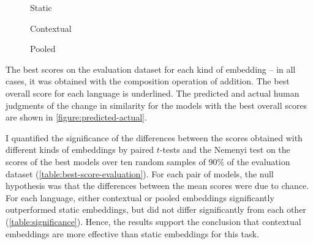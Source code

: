\begin{table}
  \centering
  \begin{subfigure}[b]{\textwidth}
    \centering
    
    \caption{Static}
  \end{subfigure}
  \subfigurespace
  \begin{subfigure}[b]{\textwidth}
    \centering
    
    \caption{Contextual}
  \end{subfigure}
  \subfigurespace
  \begin{subfigure}[b]{\textwidth}
    \centering
    
    \caption{Pooled}
  \end{subfigure}
  \caption{The best scores on the evaluation dataset for each kind of embedding -- in
    all cases, it was obtained with the composition operation of addition.
    The best overall score for each language is underlined.
    The predicted and actual human judgments of the change in similarity for the models
    with the best overall scores are shown in \cref{figure:predicted-actual}.
  }
  \label{table:best-score-evaluation}
\end{table}

I quantified the significance of the differences between the scores obtained with
different kinds of embeddings by paired $t$-tests and the Nemenyi test
\parencites{Demsar2006} on the scores of the best models over ten random samples of
90\% of the evaluation dataset (\cref{table:best-score-evaluation}).
For each pair of models, the null hypothesis was that the differences between the mean
scores were due to chance.
For each language, either contextual or pooled embeddings significantly outperformed
static embeddings, but did not differ significantly from each other
(\cref{table:significance}).
Hence, the results support the conclusion that contextual embeddings are more effective
than static embeddings for this task.



